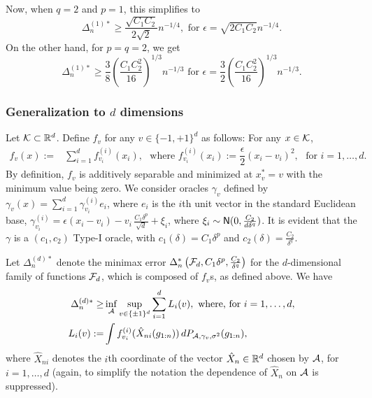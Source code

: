 Now, when $q=2$ and $p=1$, this simplifies to
\[
\Delta_n^{(1)*} \ge \dfrac{\sqrt{C_1 C_2}}{2\sqrt{2}} n^{-1/4}, \text{ for } \epsilon=\sqrt{2C_1C_2} n^{-1/4}.
\]
On the other hand, for $p=q=2$, we get
\[
\Delta_n^{(1)*} \ge  \frac{3}{8}\left(\frac{C_1 C_2^2}{16}\right)^{1/3} n^{-1/3} \text{ for } \epsilon=\frac{3}{2}\left(\frac{C_1 C_2^2}{16}\right)^{1/3}n^{-1/3}.
\]



\subsubsection{Generalization to $d$ dimensions}

Let $\mathcal{K} \subset \mathbb{R}^d$.
Define $f_v$ for any $v\in \{-1,+1\}^d$ as follows: For any $x \in \mathcal{K}$, 
\begin{align*}
  f_v(x) :=& \sum_{i=1}^d f^{(i)}_{v_i}(x_i), \,\,  \text{ where }
  f^{(i)}_{v_i}(x_i) := \dfrac{\epsilon}{2} (x_i - v_i)^2, \,\, \text{ for } i=1,\ldots,d.
\end{align*}
By definition, $f_v$ is additively separable and minimized at $x^*_v=v$ with the minimum value being zero.
We consider oracles $\gamma_v$ defined by
$\gamma_v(x) = \sum_{i=1}^d \gamma_{v_i}^{(i)}e_i$, where 
$e_i$ is the $i$th unit vector in the standard Euclidean base,
$\gamma_{v_i}^{(i)} = \epsilon(x_i-v_i) - v_i\, \frac{C_1 \delta^p}{\sqrt{d}} + \xi_i$, where $\xi_i \sim \mathsf{N}(0,\frac{C_2}{d\delta^q})$. 
It is evident that the $\gamma$ is a $(c_1,c_2)$ Type-I oracle, with $c_1(\delta)=C_1\delta^p$ and $c_2(\delta)=\frac{C_2}{\delta^q}$.

Let $\Delta_n^{(d)*}$ denote the minimax error $\Delta_n^*\left(\mathcal{F}_d, C_1\delta^p,\frac{C_2}{\delta^q}\right)$ for the $d$-dimensional family of functions $\mathcal{F}_d$, which is composed of $f_v$s, as defined above. We have
\begin{align*}
 \Delta_n^{(d)*} \ge& \inf_{\mathcal{A}}  \sup_{v\in \{\pm 1 \}^d}\sum_{i=1}^d L_i(v), \text{ where, for } i=1,\ldots,d,\\
 L_i(v) := & \int f^{(i)}_{v_i}(\hat X_{ni}(g_{1:n}) )\, dP_{\mathcal{A},\gamma_v,\sigma^2}(g_{1:n}),  
\end{align*}
where $\hat{X}_{ni}$ denotes the $i$th coordinate of the vector $\hat{X}_n \in \mathbb{R}^d$ chosen by $\mathcal{A}$, for $i=1,\ldots,d$
(again, to simplify the notation the dependence of $\hat{X}_n$ on $\mathcal{A}$ is suppressed).


